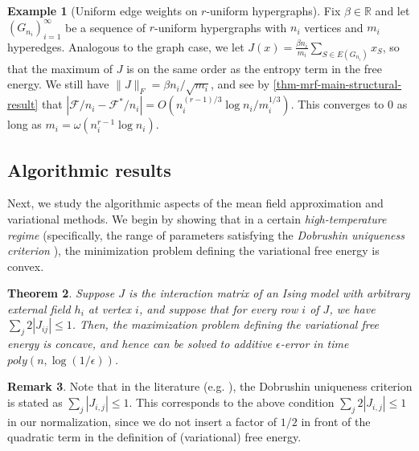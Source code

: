 \documentclass[final, 12pt]{colt2018}
\newtheorem{theorem}{Theorem}[section]
\theoremstyle{definition}
\newtheorem{remark}[theorem]{Remark}
\newtheorem{example}[theorem]{Example}
\theoremstyle{plain}
\begin{document}
\begin{example}[Uniform edge weights on $r$-uniform hypergraphs]
Fix $\beta \in \mathbb{R}$ and
let $(G_{n_i})_{i=1}^{\infty}$ be a sequence of $r$-uniform hypergraphs
with $n_i$ vertices and $m_i$ hyperedges. Analogous to the graph case, we let $J(x) = \frac{\beta n_i}{m_i} \sum_{S \in E(G_{n_i})} x_S$,
so that the maximum of $J$ is on the same order as the entropy term in the free energy. We still have $\|J\|_F = \beta n_i/\sqrt{m_i}$, and see by \cref{thm-mrf-main-structural-result} that $|\mathcal{F}/n_i - \mathcal{F}^*/n_i| = O(n_i^{(r - 1)/3}\log{n_i}/m_i^{1/3})$. This converges
to $0$ as long as $m_i = \omega(n_i^{r - 1} \log{n_i})$.
\end{example}
\subsection{Algorithmic results}
Next, we study the algorithmic aspects of the mean field approximation and variational methods. We begin by showing that in a certain \emph{high-temperature regime} (specifically, the range of parameters satisfying the \emph{Dobrushin uniqueness criterion} \citet{dobrushin-uniqueness}), the minimization problem
defining the variational free energy is convex.  %
\begin{theorem}\label{thm:high-temperature-convex}
Suppose $J$ is the interaction matrix of an Ising model with
arbitrary external field $h_i$ at vertex $i$, and suppose that
for every row $i$ of $J$, we have $\sum_{j} 2|J_{ij}| \le 1$.
Then, the maximization problem defining the variational free energy is concave, and hence can be solved to additive $\epsilon$-error in time $poly(n,\log(1/\epsilon))$.
\end{theorem}

\begin{remark}
Note that in the literature (e.g. \citet{dobrushin-uniqueness}), the Dobrushin uniqueness criterion is stated as $\sum_j |J_{i,j}| \leq 1$. This corresponds to the above condition $\sum_j 2|J_{i,j}| \leq 1$ in our normalization, since we do not insert a factor of ${1/2}$ in front of the quadratic term in the definition of (variational) free energy.
\end{remark}
\end{document}
